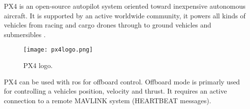 
PX4 is an open-source autopilot system oriented toward inexpensive autonomous aircraft. 
It is supported by an active worldwide community, it powers all kinds of vehicles from racing and 
cargo drones through to ground vehicles and submersibles \cite{px4:docs}.

\begin{figure}[ht]
    \centering
    \texttt{[image: px4logo.png]}
    \caption[PX4 logo]{PX4 logo\footnotemark.}
\end{figure}

PX4 can be used with \acs{ros} for offboard control. Offboard mode is primarly used for controlling a vehicles position, velocity and thrust.
It requires an active connection to a remote MAVLINK system (HEARTBEAT messages).